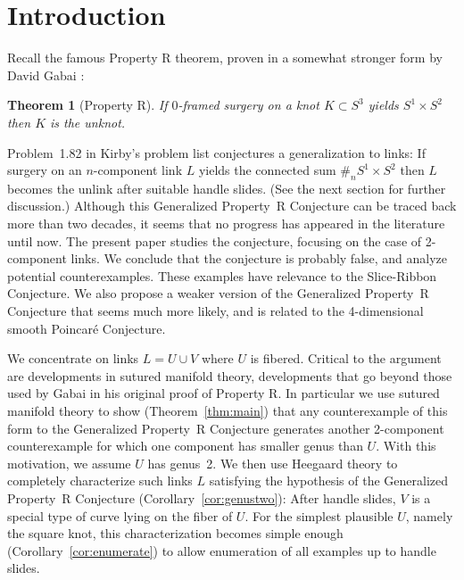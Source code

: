 \documentclass{amsart}
\newtheorem{thm}{Theorem}[section]
\begin{document}
\maketitle

\section{Introduction}

Recall the famous Property R theorem, proven in a somewhat stronger form by David Gabai \cite{Ga1}:

\begin{thm}[Property R] \label{thm:PropR} If $0$-framed surgery on a knot $K \subset S^3$ yields $S^1 \times S^2$ then $K$ is the unknot.
\end{thm}

\noindent Problem~1.82 in Kirby's problem list \cite{Ki2} conjectures a generalization to links: If surgery on an $n$-component link $L$ yields the connected sum $\#_nS^1\times S^2$ then $L$ becomes the unlink after suitable handle slides. (See the next section for further discussion.) Although this Generalized Property~R Conjecture can be traced back more than two decades, it seems that no progress has appeared in the literature until now. The present paper studies the conjecture, focusing on the case of 2-component links. We conclude that the conjecture is probably false, and analyze potential counterexamples. These examples have relevance to the Slice-Ribbon Conjecture. We also propose a weaker version of the Generalized Property~R Conjecture that seems much more likely, and is related to the 4-dimensional smooth Poincar\'e Conjecture.

We concentrate on links $L=U\cup V$ where $U$ is fibered. Critical to the argument are developments in sutured manifold theory, developments that go beyond those used by Gabai in his original proof of Property R. In particular we use sutured manifold theory to show (Theorem~\ref{thm:main}) that any counterexample of this form to the Generalized Property~R Conjecture generates another 2-component counterexample for which one component has smaller genus than $U$. With this motivation, we assume $U$ has genus~2. We then use Heegaard theory to completely characterize such links $L$ satisfying the hypothesis of the Generalized Property~R Conjecture (Corollary~\ref{cor:genustwo}): After handle slides, $V$ is a special type of curve lying on the fiber of $U$. For the simplest plausible $U$, namely the square knot, this characterization becomes simple enough (Corollary~\ref{cor:enumerate}) to allow enumeration of all examples up to handle slides.
\end{document}
